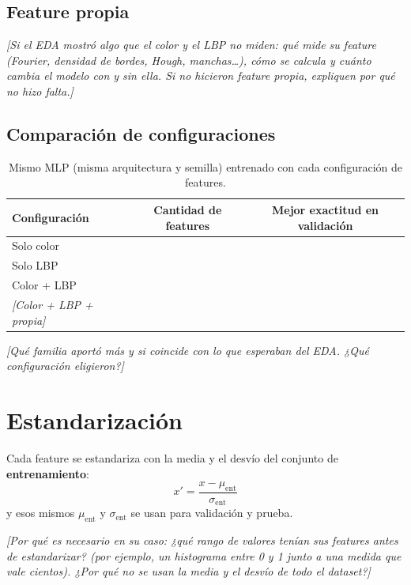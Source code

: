 \documentclass[11pt,a4paper]{article}
\newcommand{\completar}[1]{\textcolor{gris}{\textit{[#1]}}}
\begin{document}
\subsection{Feature propia}
 
\completar{Si el EDA mostró algo que el color y el LBP no miden: qué mide su feature (Fourier, densidad de bordes, Hough, manchas\ldots), cómo se calcula y cuánto cambia el modelo con y sin ella. Si no hicieron feature propia, expliquen por qué no hizo falta.}
 
 
\subsection{Comparación de configuraciones}
 
\begin{table}[H]
  \centering
  \label{tab:configuraciones}
  \begin{tabular}{lcc}
    \toprule
    Configuración & Cantidad de features & Mejor exactitud en validación \\
    \midrule
    Solo color & & \\
    Solo LBP & & \\
    Color + LBP & & \\
    \completar{Color + LBP + propia} & & \\
    \bottomrule
  \end{tabular}
  \caption{Mismo MLP (misma arquitectura y semilla) entrenado con cada configuración de features.}
\end{table}
 
\completar{Qué familia aportó más y si coincide con lo que esperaban del EDA. ¿Qué configuración eligieron?}
 
\section{Estandarización}
 
Cada feature se estandariza con la media y el desvío del conjunto de \textbf{entrenamiento}:
\[
  x' = \frac{x - \mu_{\text{ent}}}{\sigma_{\text{ent}}}
\]
y esos mismos $\mu_{\text{ent}}$ y $\sigma_{\text{ent}}$ se usan para validación y prueba.
 
\completar{Por qué es necesario en su caso: ¿qué rango de valores tenían sus features antes de estandarizar? (por ejemplo, un histograma entre 0 y 1 junto a una medida que vale cientos). ¿Por qué no se usan la media y el desvío de todo el dataset?}
 
\end{document}
